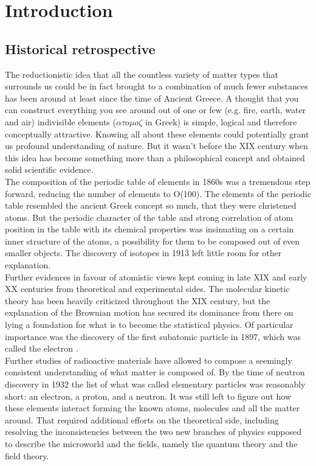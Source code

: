 \section{Introduction}

\subsection{Historical retrospective}
    The reductionistic idea that all the countless variety of matter types that surrounds us could be in fact brought to a combination of much fewer substances has been around at least since the time of Ancient Greece. A thought that you can construct everything you see around out of one or few (e.g. fire, earth, water and air) indivisible elements ($\alpha \tau o \mu o \zeta$ in Greek) is simple, logical and therefore conceptually attractive. Knowing all about these elements could potentially grant us profound understanding of nature. But it wasn't before the XIX century when this idea has become something more than a philosophical concept and obtained solid scientific evidence. \\
The composition of the periodic table of elements in 1860s \cite{mendel} was a tremendous step forward, reducing the number of elements to O(100). The elements of the periodic table resembled the ancient Greek concept so much, that they were christened atoms. But the periodic character of the table and strong correlation of atom position in the table with its chemical properties was insinuating on a certain inner structure of the atoms, a possibility for them to be composed out of even smaller objects. The discovery of isotopes in 1913 \cite{isotopes} left little room for other explanation.\\
Further evidences in favour of atomistic views kept coming in late XIX and early XX centuries from theoretical and experimental sides. The molecular kinetic theory has been heavily criticized throughout the XIX century, but the explanation of the Brownian motion \cite{brownian} has secured its dominance from there on lying a foundation for what is to become the statistical physics. Of particular importance was the discovery of the first subatomic particle in 1897, which was called the electron \cite{cathode}. \\
Further studies of radioactive materials have allowed to compose a seemingly consistent understanding of what matter is composed of. By the time of neutron discovery in 1932 \cite{neutron} the list of what was called elementary particles was reasonably short: an electron, a proton, and a neutron. It was still left to figure out how these elements interact forming the known atoms, molecules and all the matter around. That required additional efforts on the theoretical side, including resolving the inconsistencies between the two new branches of physics supposed to describe the microworld and the fields, namely the quantum theory and the field theory. \\
